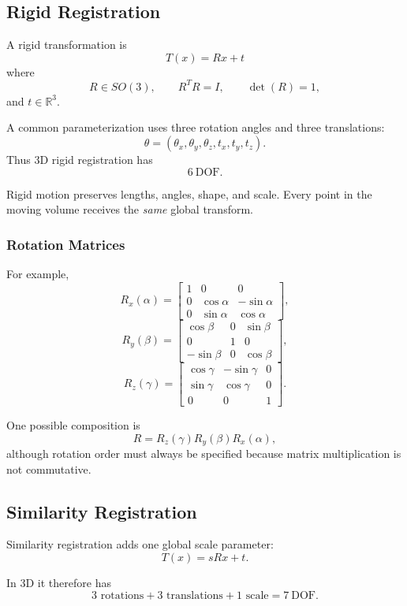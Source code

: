 \documentclass[11pt,a4paper]{article}
\newcommand{\R}{\mathbb{R}}
\begin{document}
\subsection{Rigid Registration}

A rigid transformation is
\[
\boxed{T(x)=Rx+t}
\]
where
\[
R\in SO(3),
\qquad
R^TR=I,
\qquad
\det(R)=1,
\]
and $t\in\R^3$.

A common parameterization uses three rotation angles and three translations:
\[
\theta=
(\theta_x,\theta_y,\theta_z,t_x,t_y,t_z).
\]
Thus 3D rigid registration has
\[
\boxed{6\ \text{DOF}}.
\]

Rigid motion preserves lengths, angles, shape, and scale. Every point in the moving volume receives the \emph{same} global transform.

\subsubsection{Rotation Matrices}

For example,
\[
R_x(\alpha)=
\begin{bmatrix}
1&0&0\\
0&\cos\alpha&-\sin\alpha\\
0&\sin\alpha&\cos\alpha
\end{bmatrix},
\]
\[
R_y(\beta)=
\begin{bmatrix}
\cos\beta&0&\sin\beta\\
0&1&0\\
-\sin\beta&0&\cos\beta
\end{bmatrix},
\]
\[
R_z(\gamma)=
\begin{bmatrix}
\cos\gamma&-\sin\gamma&0\\
\sin\gamma&\cos\gamma&0\\
0&0&1
\end{bmatrix}.
\]

One possible composition is
\[
R=R_z(\gamma)R_y(\beta)R_x(\alpha),
\]
although rotation order must always be specified because matrix multiplication is not commutative.

\subsection{Similarity Registration}

Similarity registration adds one global scale parameter:
\[
T(x)=sRx+t.
\]

In 3D it therefore has
\[
3\text{ rotations}+3\text{ translations}+1\text{ scale}
=
\boxed{7\ \text{DOF}}.
\]
\end{document}
